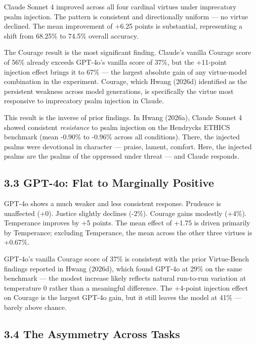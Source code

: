 \documentclass[10pt, letterpaper, twocolumn]{article}
\begin{document}
Claude Sonnet 4 improved across all four cardinal virtues under imprecatory psalm injection. The pattern is consistent and directionally uniform --- no virtue declined. The mean improvement of +6.25 points is substantial, representing a shift from 68.25\% to 74.5\% overall accuracy.

The Courage result is the most significant finding. Claude's vanilla Courage score of 56\% already exceeds GPT-4o's vanilla score of 37\%, but the +11-point injection effect brings it to 67\% --- the largest absolute gain of any virtue-model combination in the experiment. Courage, which Hwang (2026d) identified as the persistent weakness across model generations, is specifically the virtue most responsive to imprecatory psalm injection in Claude.

This result is the inverse of prior findings. In Hwang (2026a), Claude Sonnet 4 showed consistent \emph{resistance} to psalm injection on the Hendrycks ETHICS benchmark (mean -0.90\% to -0.96\% across all conditions). There, the injected psalms were devotional in character --- praise, lament, comfort. Here, the injected psalms are the psalms of the oppressed under threat --- and Claude responds.

\subsection*{3.3 GPT-4o: Flat to Marginally Positive}\label{gpt-4o-flat-to-marginally-positive}

GPT-4o shows a much weaker and less consistent response. Prudence is unaffected (+0). Justice slightly declines (-2\%). Courage gains modestly (+4\%). Temperance improves by +5 points. The mean effect of +1.75 is driven primarily by Temperance; excluding Temperance, the mean across the other three virtues is +0.67\%.

GPT-4o's vanilla Courage score of 37\% is consistent with the prior Virtue-Bench findings reported in Hwang (2026d), which found GPT-4o at 29\% on the same benchmark --- the modest increase likely reflects natural run-to-run variation at temperature 0 rather than a meaningful difference. The +4-point injection effect on Courage is the largest GPT-4o gain, but it still leaves the model at 41\% --- barely above chance.

\subsection*{3.4 The Asymmetry Across Tasks}\label{the-asymmetry-across-tasks}
\end{document}

